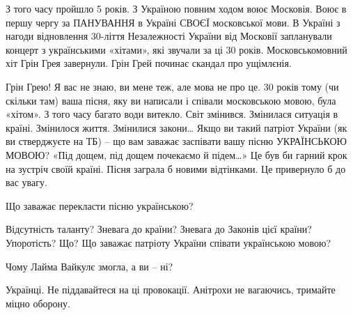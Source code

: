 З того часу пройшло 5 років. З Україною повним ходом воює Московія. Воює в
першу чергу за ПАНУВАННЯ в Україні СВОЄЇ московської мови. В Україні з нагоди
відновлення 30-ліття Незалежності України від Московії запланували концерт з
українськими «хітами», які звучали за ці 30 років. Московськомовний хіт Грін
Грея завернули. Грін Грей починає скандал про ущімлєнія.

Грін Грею! Я вас не знаю, ви мене теж, але мова не про це. 30 років тому (чи
скільки там) ваша пісня, яку ви написали і співали московською мовою, була
«хітом». З того часу багато води витекло. Світ змінився. Змінилася ситуація в
країні. Змінилося життя. Змінилися закони… Якщо ви такий патріот України (як ви
стверджуєте на ТБ) – що вам заважає заспівати вашу пісню УКРАЇНСЬКОЮ МОВОЮ?
«Під дощем, під дощем почекаємо й підем…» Це був би гарний крок на зустріч
своїй країні. Пісня заграла б новими відтінками. Це привернуло б до вас увагу.

Що заважає перекласти пісню українською? 

Відсутність таланту? Зневага до країни? Зневага до Законів цієї країни?
Упоротість? Що? Що заважає патріоту України співати українською мовою?

Чому Лайма Вайкулє змогла, а ви – ні? 

Українці. Не піддавайтеся на ці провокації. Анітрохи не вагаючись, тримайте
міцно оборону.

